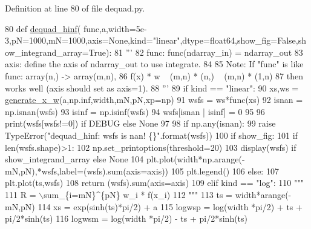 Definition at line 80 of file dequad.\+py.


\begin{DoxyCode}
80 \textcolor{keyword}{def }\hyperlink{namespacedequad_a2654bb61f33ab8685320882396c81ae0}{dequad\_hinf}(
      func,a,width=5e-3,pN=1000,mN=1000,axis=None,kind="linear",dtype=float64,show\_fig=False,show\_integrand\_array=True):
81     \textcolor{stringliteral}{'''}
82 \textcolor{stringliteral}{    func: func(ndarray\_in) = ndarray\_out}
83 \textcolor{stringliteral}{    axis: define the axis of ndarray\_out to use integrate.}
84 \textcolor{stringliteral}{    }
85 \textcolor{stringliteral}{    Note: If "func" is like func: array(n,) -> array(m,n),}
86 \textcolor{stringliteral}{              f(x) * w ~ (m,n) * (n,) ~ (m,n) * (1,n)}
87 \textcolor{stringliteral}{          then works well (axis should set as axis=1). }
88 \textcolor{stringliteral}{    '''}
89     \textcolor{keywordflow}{if} kind == \textcolor{stringliteral}{"linear"}:
90         xs,ws = \hyperlink{namespacedequad_a0774348e796cb0945f2e0b0a7fa1c1e9}{generate\_x\_w}(a,np.inf,width,mN,pN,xp=np)
91         wsfs = ws*func(xs)
92         isnan = np.isnan(wsfs)
93         isinf = np.isinf(wsfs)
94         wsfs[isnan | isinf] = 0
95         
96         print(wsfs[wsfs!=0]) \textcolor{keywordflow}{if} DEBUG \textcolor{keywordflow}{else} \textcolor{keywordtype}{None}
97         
98         \textcolor{keywordflow}{if} np.any(isnan):
99             \textcolor{keywordflow}{raise} TypeError(\textcolor{stringliteral}{"dequad\_hinf: wsfs is nan! \{\}"}.format(wsfs))
100         \textcolor{keywordflow}{if} show\_fig:
101             \textcolor{keywordflow}{if} len(wsfs.shape)>1:
102                 np.set\_printoptions(threshold=20)
103                 display(wsfs) \textcolor{keywordflow}{if} show\_integrand\_array \textcolor{keywordflow}{else} \textcolor{keywordtype}{None}
104                 plt.plot(width*np.arange(-mN,pN),*wsfs,label=(wsfs).sum(axis=axis))
105                 plt.legend()
106             \textcolor{keywordflow}{else}:
107                 plt.plot(ts,wsfs)
108         \textcolor{keywordflow}{return} (wsfs).sum(axis=axis)
109     \textcolor{keywordflow}{elif} kind == \textcolor{stringliteral}{"log"}:
110         \textcolor{stringliteral}{"""}
111 \textcolor{stringliteral}{        R = \(\backslash\)sum\_\{i=mN\}^\{pN\} w\_i * f(x\_i)}
112 \textcolor{stringliteral}{        """}
113         ts = width*arange(-mN,pN)
114         xs = exp(sinh(ts)*pi/2) + a
115         logwsp = log(width *pi/2) + ts + pi/2*sinh(ts)
116         logwsm = log(width *pi/2) - ts + pi/2*sinh(ts)

\end{DoxyCode}
